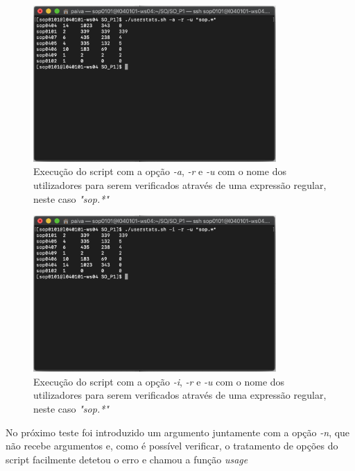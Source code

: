 \documentclass[10pt,portuguese]{article}
\begin{document}
\begin{figure}[!h]
    \centering
    \includegraphics[width=350]{Resultados/-a_-r_-u.png}
    \caption{Execução do script com a opção \textit{-a}, \textit{-r} e \textit{-u} com o nome dos utilizadores para serem verificados através de uma expressão regular, neste caso \textit{"sop.*"}}
\end{figure}

\begin{figure}[!h]
    \centering
    \includegraphics[width=350]{Resultados/-i_-r_-u.png}
    \caption{Execução do script com a opção \textit{-i}, \textit{-r} e \textit{-u} com o nome dos utilizadores para serem verificados através de uma expressão regular, neste caso \textit{"sop.*"}}
\end{figure}
\clearpage

No próximo teste foi introduzido um argumento juntamente com a opção \textit{-n}, que não recebe argumentos e, como é possível verificar, o tratamento de opções do script facilmente detetou o erro e chamou a função \textit{usage}
\end{document}
